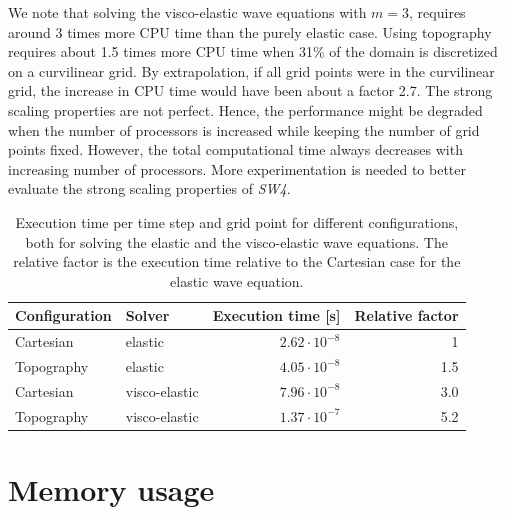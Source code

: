 \documentclass[11pt]{report}
\begin{document}
We note that solving the visco-elastic wave equations with $m=3$, requires around 3 times more CPU
time than the purely elastic case. Using topography requires about 1.5 times more CPU time when 31\%
of the domain is discretized on a curvilinear grid. By extrapolation, if all grid points were in the
curvilinear grid, the increase in CPU time would have been about a factor 2.7.  The strong scaling
properties are not perfect. Hence, the performance might be degraded when the number of processors
is increased while keeping the number of grid points fixed. However, the total computational time
always decreases with increasing number of processors. More experimentation is needed to better
evaluate the strong scaling properties of \emph{SW4}.
\begin{table}
\begin{center}
\begin{tabular}{|l|l|r|r|}\hline
Configuration              & Solver        & Execution time [s] & Relative factor \\ \hline\hline
Cartesian   & elastic       & $2.62\cdot 10^{-8}$ & 1 \\ \hline
Topography  & elastic       & $4.05\cdot 10^{-8}$ & 1.5 \\ \hline
Cartesian   & visco-elastic & $7.96\cdot 10^{-8}$ & 3.0\\ \hline
Topography  & visco-elastic & $1.37\cdot 10^{-7}$ & 5.2\\ \hline
\end{tabular}
\end{center}
\caption{Execution time per time step and grid point for different configurations, both for
  solving the elastic and the visco-elastic wave equations. The relative factor is the execution time
   relative to the Cartesian case for the elastic wave equation.}\label{tab:cputime-usage}
 \end{table}

\section{Memory usage}
\end{document}
